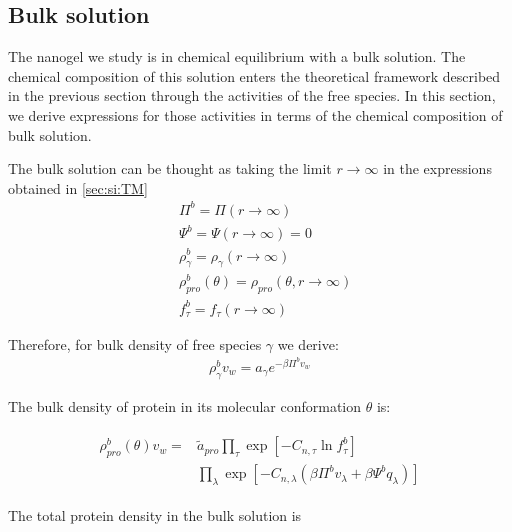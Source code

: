 \documentclass[journal=jacsat,manuscript=suppinfo]{achemso}
\begin{document}
\subsection{Bulk solution}

The nanogel we study is in chemical equilibrium with a bulk solution.
The chemical composition of this solution enters the theoretical framework described in the previous section through the activities of the free species. In this section, we derive expressions for those activities in terms of the chemical composition of bulk solution. 






The bulk solution can be thought as taking the limit $r \rightarrow \infty$ in the expressions obtained in \cref{sec:si:TM}
\begin{align}
	& \Pi^b = \Pi(r \rightarrow \infty) \\
	& \Psi^b=\Psi(r \rightarrow \infty) =  0 \\
	& \rho^b_\gamma =\rho_\gamma (r \rightarrow \infty)  \\
	& \rho^b_{pro}(\theta) = \rho_{pro}(\theta, r \rightarrow \infty) \\
	& f_\tau^b = f_\tau(r \rightarrow \infty)
\end{align}





Therefore, for bulk density of free species  $\gamma$ we derive:
\begin{align}
	\rho_\gamma^b v_w = a_\gamma e^{-\beta\Pi^bv_w}
	\label{si:eq:free-bulk}
\end{align}


The  bulk density  of protein in its molecular conformation $\theta$ is:

\begin{align}
	\begin{aligned}
		\rho^b_{pro}(\theta)v_w = &\tilde{a}_{pro} \prod_\tau\exp\left[-C_{n,\tau} \ln f^b_\tau\right] \\
		&\prod_\lambda \exp \left[-C_{n,\lambda} (\beta\Pi^b v_\lambda + \beta\Psi^b q_\lambda ) \right]    
	\end{aligned}
	\label{si:eq:bulk-protein}
\end{align}


The total protein density in the bulk solution is
\end{document}
